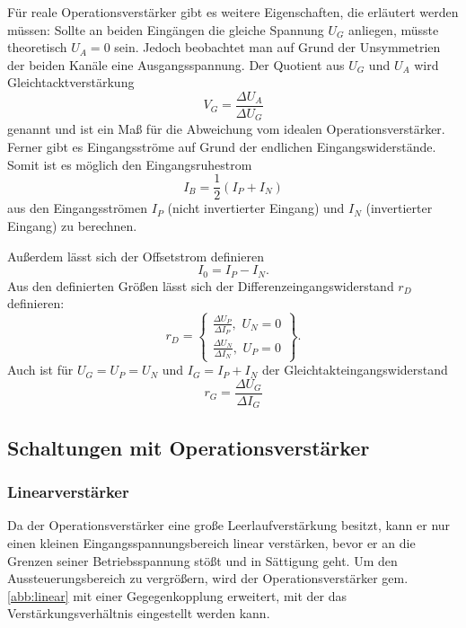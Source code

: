 Für reale Operationsverstärker gibt es weitere Eigenschaften, die erläutert werden müssen:
Sollte an beiden Eingängen die gleiche Spannung $U_G$ anliegen, müsste theoretisch $U_A = 0$ sein. Jedoch beobachtet man auf Grund der Unsymmetrien der beiden Kanäle eine Ausgangsspannung.
Der Quotient aus $U_G$ und $U_A$ wird Gleichtacktverstärkung
\begin{equation}
V_G = \frac{\Delta U_A}{\Delta U_G}
\end{equation}
genannt und ist ein Maß für die Abweichung vom idealen Operationsverstärker.
Ferner gibt es Eingangsströme auf Grund der endlichen Eingangswiderstände. Somit ist es möglich den Eingangsruhestrom
\begin{equation}
I_B = \frac{1}{2} (I_P + I_N)
\end{equation}
aus den Eingangsströmen $I_P$ (nicht invertierter Eingang) und $I_N$ (invertierter Eingang) zu berechnen.

Außerdem lässt sich der Offsetstrom definieren
\begin{equation}
I_0 = I_P - I_N.
\end{equation}
Aus den definierten Größen lässt sich der Differenzeingangswiderstand $r_D$ definieren:
\begin{equation}
r_D = \left\{\begin{array}{ll} \frac{\Delta U_P}{\Delta I_P}, \, \, U_N = 0\\
	  \frac{\Delta U_N}{\Delta I_N}, \, \, U_P = 0\end{array}\right\}.
\end{equation}
Auch ist für $U_G = U_P = U_N$ und $I_G = I_P + I_N$ der Gleichtakteingangswiderstand
\begin{equation}
r_G = \frac{\Delta U_G}{\Delta I_G}
\end{equation}

\subsection{Schaltungen mit Operationsverst{\"a}rker}

\subsubsection{Linearverst{\"a}rker}
Da der Operationsverstärker eine große Leerlaufverstärkung besitzt, kann  er nur einen kleinen Eingangsspannungsbereich linear verstärken, bevor er an die Grenzen  seiner Betriebsspannung stößt und in Sättigung geht. Um den Aussteuerungsbereich zu vergrößern, wird der Operationsverstärker gem. \ref{abb:linear} mit einer Gegegenkopplung erweitert, mit der das Verstärkungsverhältnis eingestellt werden kann.

